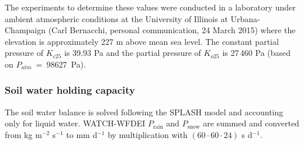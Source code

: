\documentclass{myreport}
\begin{document}
\noindent The experiments to determine these values were conducted in a laboratory under ambient atmospheric conditions at the University of Illinois at Urbana-Champaign (Carl Bernacchi, personal communication, 24 March 2015) where the elevation is approximately 227 m above mean sea level. 
The constant partial pressure of $K_{c25}$ is 39.93 Pa and the partial pressure of $K_{o25}$ is 27$\,$460 Pa (based on $P_{atm}$~=~98627~Pa).

\subsubsection{Soil water holding capacity}

The soil water balance is solved following the SPLASH model and accounting only for liquid water. WATCH-WFDEI $P_{\text{rain}}$ and $P_{\text{snow}}$ are summed and converted from kg m$^{-2}$ s$^{-1}$ to mm d$^{-1}$ by multiplication with $(60 \cdot 60 \cdot 24)$ s d$^{-1}$. 




\end{document}
